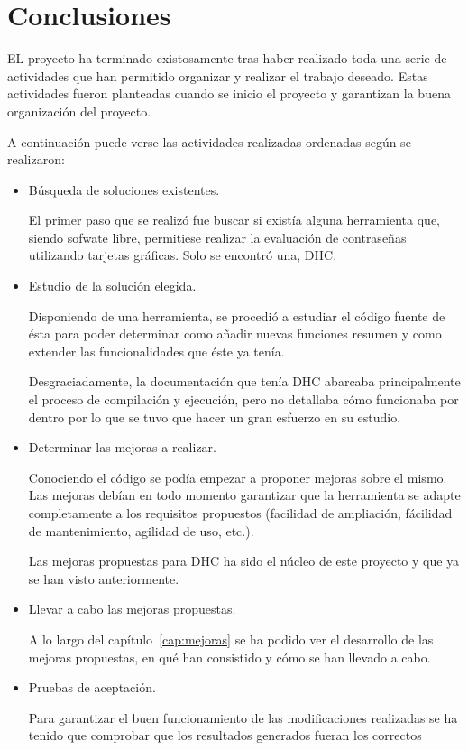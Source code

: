 \chapter{Conclusiones}

EL proyecto ha terminado existosamente tras haber realizado toda una serie de actividades que han permitido organizar y realizar el trabajo deseado. Estas actividades fueron planteadas cuando se inicio el proyecto y garantizan la buena organización del proyecto.

A continuación puede verse las actividades realizadas ordenadas según se realizaron:

\begin{itemize}
	\item Búsqueda de soluciones existentes.

		El primer paso que se realizó fue buscar si existía alguna herramienta que, siendo sofwate libre, permitiese realizar la evaluación de contraseñas utilizando tarjetas gráficas. Solo se encontró una, DHC.

	\item Estudio de la solución elegida.

		Disponiendo de una herramienta, se procedió a estudiar el código fuente de ésta para poder determinar como añadir nuevas funciones resumen y como extender las funcionalidades que éste ya tenía.

		Desgraciadamente, la documentación que tenía DHC abarcaba principalmente el proceso de compilación y ejecución, pero no detallaba cómo funcionaba por dentro por lo que se tuvo que hacer un gran esfuerzo en su estudio.

	\item Determinar las mejoras a realizar.

		Conociendo el código se podía empezar a proponer mejoras sobre el mismo. Las mejoras debían en todo momento garantizar que la herramienta se adapte completamente a los requisitos propuestos (facilidad de ampliación, fácilidad de mantenimiento, agilidad de uso, etc.).

		Las mejoras propuestas para DHC ha sido el núcleo de este proyecto y que ya se han visto anteriormente.

	\item Llevar a cabo las mejoras propuestas.

		A lo largo del capítulo~\ref{cap:mejoras} se ha podido ver el desarrollo de las mejoras propuestas, en qué han consistido y cómo se han llevado a cabo.

	\item Pruebas de aceptación.

		Para garantizar el buen funcionamiento de las modificaciones realizadas se ha tenido que comprobar que los resultados generados fueran los correctos
\end{itemize}




